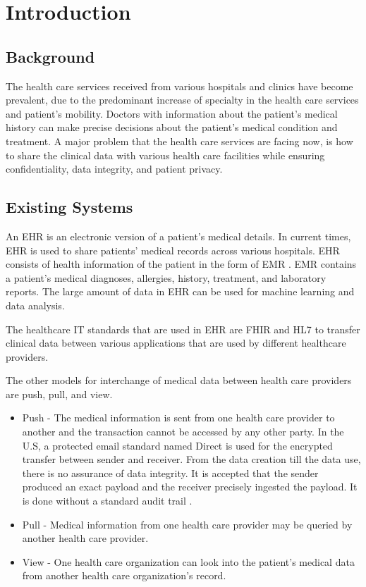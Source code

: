 \chapter{Introduction}
\label{ch:intro}

%
%
\section{Background}
\label{sec:intro:Background}
The health care services received from various hospitals and clinics have become prevalent, due to the predominant increase of specialty in the health care services and patient's mobility. Doctors with information about the patient’s medical history can make precise decisions about the patient’s medical condition and treatment. A major problem that the health care services are facing now, is how to share the clinical data with various health care facilities while ensuring confidentiality, data integrity, and patient privacy.

%
%
\section{Existing Systems}
\label{sec:intro:Existing System}
An \ac{EHR} is an electronic version of a patient's medical details.
In current times, \ac{EHR} is used to share patients' medical records across various hospitals. \ac{EHR} consists of health information of the patient in the form of \ac{EMR} \cite{EHR}. \ac{EMR} contains a patient’s medical diagnoses, allergies, history, treatment, and laboratory reports\cite{blockchain}. The large amount of data in \ac{EHR} can be used for machine learning and data analysis.

The healthcare IT standards that are used in \ac{EHR} are \ac{FHIR} and  \ac{HL7} to transfer clinical data between various applications that are used by different healthcare providers.

The other models for interchange of medical data between health care providers are push, pull, and view.

\begin{itemize}
    \item Push - The medical information is sent from one health care provider to another and the transaction cannot be accessed by any other party. In the U.S, a protected email standard named Direct is used for the encrypted transfer between sender and receiver.
    From the data creation till the data use, there is no assurance of data integrity. It is accepted that the sender produced an exact payload and the receiver precisely ingested the payload. It is done without a standard audit trail \cite{potential}.
    \item Pull - Medical information from one health care provider may be queried by another health care provider.
    \item View - One health care organization can look into the patient's medical data from another health care  organization's record\cite{potential}. 
\end{itemize}



